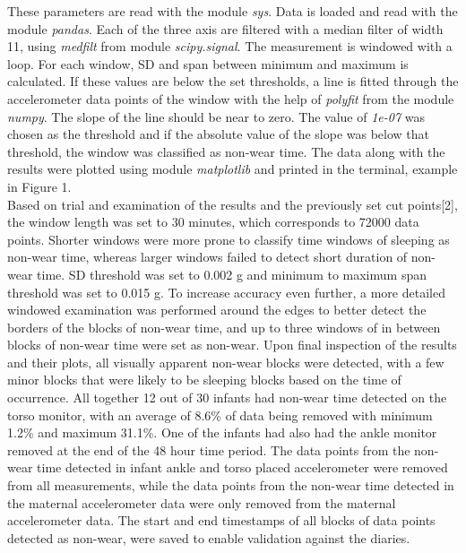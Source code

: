 \documentclass{article}
\begin{document}
{\begin{itemize}
\end{itemize}
These parameters are read with the module \textit{sys}. Data is loaded and read with the module \textit{pandas}. Each of the three axis are filtered with a median filter of width 11, using \textit{medfilt} from module \textit{scipy.signal}. The measurement is windowed with a loop. For each window, SD and span between minimum and maximum is calculated. If these values are below the set thresholds, a line is fitted through the accelerometer data points of the window with the help of \textit{polyfit} from the module \textit{numpy}. The slope of the line should be near to zero. The value of \textit{1e-07} was chosen as the threshold and if the absolute value of the slope was below that threshold, the window was classified as non-wear time. The data along with the results were plotted using module \textit{matplotlib} and printed in the terminal, example in Figure 1.\\
Based on  trial and examination of the results and the previously set cut points[2], the window length was set to 30 minutes, which corresponds to 72000 data points. Shorter windows were more prone to classify time windows of sleeping as non-wear time, whereas larger windows failed to detect short duration of non-wear time. SD threshold was set to 0.002 g and minimum to maximum span threshold was set to 0.015 g.  To increase accuracy even further, a more detailed windowed examination was performed around the edges to better detect the borders   of the blocks of non-wear time, and up to three windows of in between blocks of non-wear time were set as non-wear. 
Upon final inspection of the results and their plots, all visually apparent non-wear blocks were detected, with a few minor blocks that were likely to be sleeping blocks based on the time of occurrence. All together 12 out of 30 infants had non-wear time detected on the torso monitor, with an average of 8.6\% of data being removed with minimum 1.2\% and maximum 31.1\%. One of the infants had also had the ankle monitor removed at the end of the 48 hour time period. The data points from the non-wear time detected in infant ankle and torso placed accelerometer were removed from all measurements, while the data points from the non-wear time detected in the maternal accelerometer data were only removed from the maternal accelerometer data. The start and end timestamps of all blocks of data points detected as non-wear, were saved to enable validation against the diaries. 

}
\end{document}
